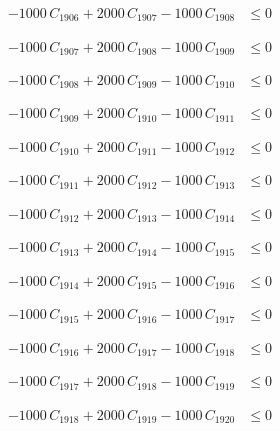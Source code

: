 \documentclass[a4paper,11pt]{article}
\begin{document}
\begin{align}
-1000\,C_{1906} + 2000\,C_{1907} - 1000\,C_{1908} &\leq 0 \nonumber
\end{align}

\begin{align}
-1000\,C_{1907} + 2000\,C_{1908} - 1000\,C_{1909} &\leq 0 \nonumber
\end{align}

\begin{align}
-1000\,C_{1908} + 2000\,C_{1909} - 1000\,C_{1910} &\leq 0 \nonumber
\end{align}

\begin{align}
-1000\,C_{1909} + 2000\,C_{1910} - 1000\,C_{1911} &\leq 0 \nonumber
\end{align}

\begin{align}
-1000\,C_{1910} + 2000\,C_{1911} - 1000\,C_{1912} &\leq 0 \nonumber
\end{align}

\begin{align}
-1000\,C_{1911} + 2000\,C_{1912} - 1000\,C_{1913} &\leq 0 \nonumber
\end{align}

\begin{align}
-1000\,C_{1912} + 2000\,C_{1913} - 1000\,C_{1914} &\leq 0 \nonumber
\end{align}

\begin{align}
-1000\,C_{1913} + 2000\,C_{1914} - 1000\,C_{1915} &\leq 0 \nonumber
\end{align}

\begin{align}
-1000\,C_{1914} + 2000\,C_{1915} - 1000\,C_{1916} &\leq 0 \nonumber
\end{align}

\begin{align}
-1000\,C_{1915} + 2000\,C_{1916} - 1000\,C_{1917} &\leq 0 \nonumber
\end{align}

\begin{align}
-1000\,C_{1916} + 2000\,C_{1917} - 1000\,C_{1918} &\leq 0 \nonumber
\end{align}

\begin{align}
-1000\,C_{1917} + 2000\,C_{1918} - 1000\,C_{1919} &\leq 0 \nonumber
\end{align}

\begin{align}
-1000\,C_{1918} + 2000\,C_{1919} - 1000\,C_{1920} &\leq 0 \nonumber
\end{align}
\end{document}
